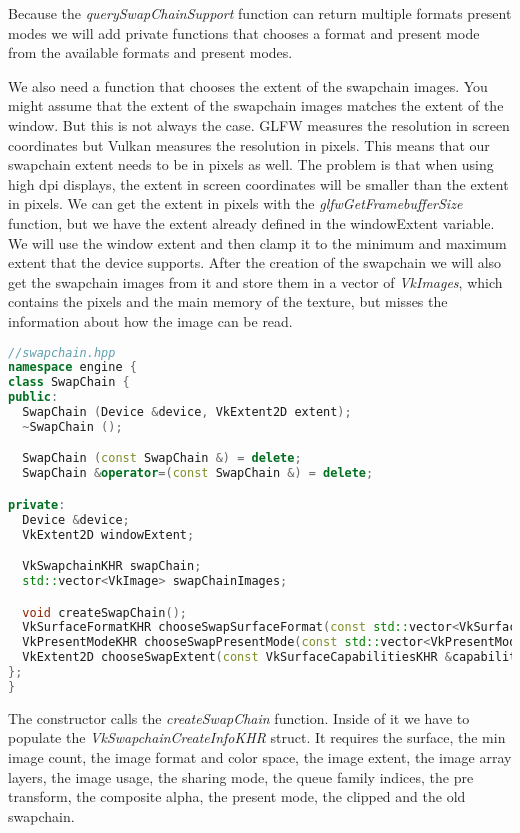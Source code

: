 \documentclass[12pt]{report} \usepackage{preamble}
\begin{document}
Because the \textit{querySwapChainSupport} function can return multiple formats present \\
modes we will add private functions that chooses a format and present mode from
the available formats and present modes.

We also need a function that chooses the extent of the swapchain images. You might assume that the extent of the
swapchain images matches the extent of the window. But this is not always the case. \ac{GLFW} measures the resolution
in screen coordinates but Vulkan measures the resolution in pixels. This means that our swapchain extent needs
to be in pixels as well. The problem is that when using high dpi displays, the extent in screen coordinates
will be smaller than the extent in pixels. We can get the extent in pixels with the \textit{glfwGetFramebufferSize}
function, but we have the extent already defined in the windowExtent variable. We will use the window extent
and then clamp it to the minimum and maximum extent that the device supports.
After the creation of the swapchain we will also get the swapchain images from it and store them in a vector of
\textit{VkImages}, which contains the pixels and the main memory of the texture, but misses the information about
how the image can be read.

\begin{lstlisting}[language=C++]
//swapchain.hpp
namespace engine {
class SwapChain {
public:
  SwapChain (Device &device, VkExtent2D extent);
  ~SwapChain ();

  SwapChain (const SwapChain &) = delete;
  SwapChain &operator=(const SwapChain &) = delete;

private:
  Device &device;
  VkExtent2D windowExtent;

  VkSwapchainKHR swapChain;
  std::vector<VkImage> swapChainImages;

  void createSwapChain();
  VkSurfaceFormatKHR chooseSwapSurfaceFormat(const std::vector<VkSurfaceFormatKHR> &availableFormats);
  VkPresentModeKHR chooseSwapPresentMode(const std::vector<VkPresentModeKHR> &availablePresentModes);
  VkExtent2D chooseSwapExtent(const VkSurfaceCapabilitiesKHR &capabilities);
};
}

\end{lstlisting}

The constructor calls the \textit{createSwapChain} function. Inside of it we have
to populate the \textit{VkSwapchainCreateInfoKHR} struct. It requires the surface,
the min image count, the image format and color space, the image extent, the image
array layers, the image usage, the sharing mode, the queue family indices, the
pre transform, the composite alpha, the present mode, the clipped and the old swapchain.
\end{document}
